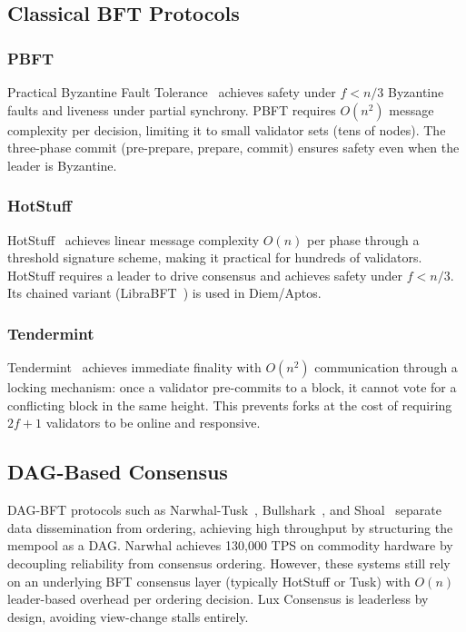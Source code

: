 \documentclass[11pt,a4paper]{article}
\begin{document}
\subsection{Classical BFT Protocols}

\subsubsection{PBFT}
Practical Byzantine Fault Tolerance~\cite{castro1999practical} achieves safety under
$f < n/3$ Byzantine faults and liveness under partial synchrony. PBFT requires
$O(n^2)$ message complexity per decision, limiting it to small validator sets (tens of
nodes). The three-phase commit (pre-prepare, prepare, commit) ensures safety even when the
leader is Byzantine.

\subsubsection{HotStuff}
HotStuff~\cite{yin2019hotstuff} achieves linear message complexity $O(n)$ per phase through
a threshold signature scheme, making it practical for hundreds of validators. HotStuff
requires a leader to drive consensus and achieves safety under $f < n/3$. Its chained
variant (LibraBFT~\cite{baudet2019state}) is used in Diem/Aptos.

\subsubsection{Tendermint}
Tendermint~\cite{buchman2016tendermint} achieves immediate finality with $O(n^2)$
communication through a locking mechanism: once a validator pre-commits to a block, it
cannot vote for a conflicting block in the same height. This prevents forks at the cost of
requiring $2f+1$ validators to be online and responsive.

\subsection{DAG-Based Consensus}

DAG-BFT protocols such as Narwhal-Tusk~\cite{danezis2022narwhal}, Bullshark~\cite{malkhi2022bullshark},
and Shoal~\cite{spiegelman2022shoal} separate data dissemination from ordering, achieving
high throughput by structuring the mempool as a DAG. Narwhal achieves 130,000 TPS on
commodity hardware by decoupling reliability from consensus ordering. However, these systems
still rely on an underlying BFT consensus layer (typically HotStuff or Tusk) with $O(n)$
leader-based overhead per ordering decision. Lux Consensus is leaderless by design, avoiding
view-change stalls entirely.
\end{document}
